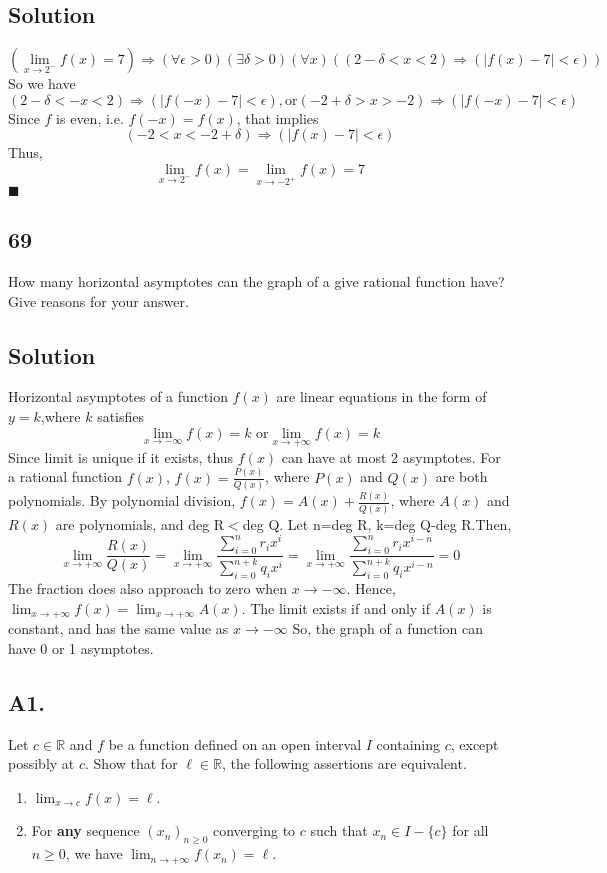 \documentclass{article}
\begin{document}
\subsection*{Solution}
\[(\lim_{x\to 2^-}f(x)=7)\Rightarrow (\forall \epsilon>0)(\exists \delta>0)(\forall x)((2-\delta<x<2)\Rightarrow (|f(x)-7|<\epsilon))\]
So we have
\[(2-\delta<-x<2)\Rightarrow (|f(-x)-7|<\epsilon),\text{or}(-2+\delta>x>-2)\Rightarrow (|f(-x)-7|<\epsilon)\]
Since $f$ is even, i.e. $f(-x)=f(x)$, that implies
\[(-2<x<-2+\delta)\Rightarrow (|f(x)-7|<\epsilon)\]
Thus, 
\[\lim_{x\to 2^-}f(x)=\lim_{x\to -2^+}f(x)=7\]
$\blacksquare$
\subsection*{69}
How many horizontal asymptotes can the graph of a give rational function have? Give reasons for your answer.
\subsection*{Solution}
Horizontal asymptotes of a function $f(x)$ are linear equations in the form of $y=k$,where $k$ satisfies
\[\lim_{x\to-\infty}f(x)=k \text{ or} \lim_{x\to+\infty}f(x)=k\]
Since limit is unique if it exists, thus $f(x)$ can have at most 2 asymptotes. \newline
For a rational function $f(x)$, $f(x)=\frac{P(x)}{Q(x)}$, where $P(x)$ and $Q(x)$ are both polynomials.
By polynomial division, $f(x)=A(x)+\frac{R(x)}{Q(x)}$, where $A(x)$ and $R(x)$ are polynomials, and deg R$<$deg Q.
Let n=deg R, k=deg Q-deg R.Then,
\[\lim _{x\to +\infty} \frac{R(x)}{Q(x)}=\lim _{x\to +\infty} \frac{\sum_{i=0}^{n}r_ix^i}{\sum_{i=0}^{n+k}q_ix^i}=\lim _{x\to  +\infty} \frac{\sum_{i=0}^{n}r_ix^{i-n}}{\sum_{i=0}^{n+k}q_ix^{i-n}}=0\]
The fraction does also approach to zero when $x\to-\infty$. Hence, 
$\lim_{x\to +\infty}f(x)=\lim_{x\to +\infty}A(x)$. The limit exists if and only if $A(x)$ is constant, and has the same value as $x\to -\infty$
So, the graph of a function can have 0 or 1 asymptotes.
\subsection*{A1.}
Let $c\in\mathbb{R}$ and $f$ be a function defined on an open interval $I$ containing $c$, except possibly at $c$. Show that for $ \ell \in \mathbb{R}$, the following assertions are equivalent.
\begin{enumerate}
    \item $\lim_{x\to c} f(x)=\ell$.
    \item For \textbf{any} sequence $(x_n)_{n\geq 0}$ converging to $c$ such that $x_n\in I-\{c\}$ for all $n\geq 0$, we have $\lim _{n\to +\infty}f(x_n)=\ell$.
\end{enumerate}
\end{document}
